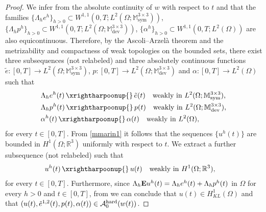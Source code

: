 \documentclass[reqno,10pt]{amsart}
\numberwithin{equation}{section}
\theoremstyle{remark}
\newcommand{\RED}{\color{black}}
\newcommand{\BLACK}{\color{black}}
\newcommand{\calA}{\mathcal{A}}
\newcommand{\M}{\mathbb{M}}
\newcommand{\R}{\mathbb{R}}
\DeclareMathOperator{\dev}{dev}
\DeclareMathOperator{\sym}{sym}
\newcommand{\weak}{\,\xrightharpoonup{}\,}
\newcommand{\E}{{\bf E}}
\begin{document}
\begin{proof}
We infer from the absolute continuity of $w$ with respect to $t$ and  
that the families $\{\Lambda_h e^h\}_{h>0} \subset W^{1,1}(0,T;L^2(\Omega;\M^{3 \times 3}_{\sym}))$, $\{\Lambda_h p^h\}_{h>0} \subset W^{1,1}(0,T;L^2(\Omega;\M^{3 \times 3}_{\dev}))$, $\{\alpha^h\}_{h>0} \subset W^{1,1}(0,T;L^2(\Omega))$ are also equicontinuous.
Therefore, by the Ascoli--Arzel\`{a} theorem and the metrizability and compactness of weak topologies on the bounded sets{\RED,\BLACK} there exist three subsequences {\RED(not relabeled)\BLACK} and three absolutely continuous functions $\tilde{e} : [0, T] \to L^2(\Omega;\M^{3 \times 3}_{\sym})$, $p : [0, T] \to L^2(\Omega;\M^{3 \times 3}_{\dev})$ and $\alpha : [0, T] \to L^2(\Omega)$ such that
\begin{align}
	\label{compactness e^h(t)} & \Lambda_h e^h(t) \weak \tilde{e}(t) \quad \text{weakly in $L^2(\Omega;\M^{3 \times 3}_{\sym})$},\\
	\label{compactness p^h(t)} & \Lambda_h p^h(t) \weak p(t) \quad \text{weakly in $L^2(\Omega;\M^{3 \times 3}_{\dev})$},\\
	\label{compactness alpha^h(t)} & \alpha^h(t) \weak \alpha(t) \quad \text{weakly in $L^2(\Omega)$},
\end{align}
for every $t \in [0, T]$.
{\RED From \eqref{mmarin1} it follows that the sequences $\{u^h(t)\}$ are bounded in $H^1(\Omega;\R^3)$ uniformly with respect to $t$.
We extract a further subsequence (not relabeled) such that
\begin{align}
	\label{compactness u^h(t)} & u^h(t) \weak u(t) \quad \text{weakly in $H^1(\Omega;\R^3)$},
\end{align}
for every $t \in [0, T]$.\BLACK}
Furthermore, since $\Lambda_h {\E}u^h(t) = \Lambda_h e^h(t) + \Lambda_h p^h(t)$ in $\Omega$ for every $h > 0$ and $t \in [0, T]$, from   we can conclude that $u(t) \in H^1_{KL}(\Omega)$ and that $(u(t), \tilde{e}^{1,2}(t), p(t), \alpha(t)) \in \calA_{0}^{\rm hard}(w(t))$.



\end{proof}
\end{document}
